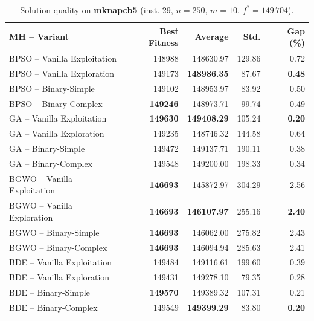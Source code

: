 \documentclass[journal,article,submit,moreauthors]{Definitions/mdpi}
\begin{document}
\begin{table}[htbp]
  \centering
  \small
  \caption{Solution quality on \textbf{mknapcb5} (inst. 29, $n=250$, $m=10$, $f^*=149\,704$).}
  \label{tab:calidad_mknapcb5_29}
  \begin{tabular}{lrrrr}
    \toprule
    \textbf{MH -- Variant} &
    \textbf{Best Fitness} &
    \textbf{Average} &
    \textbf{Std.} &
    \textbf{Gap (\%)} \\
    \midrule
    BPSO -- Vanilla Exploitation &         148988 &        148630.97 & 129.86 &         0.72 \\
    BPSO -- Vanilla Exploration  &         149173 & \textbf{148986.35} &  87.67 & \textbf{0.48} \\
    BPSO -- Binary-Simple        &         149102 &        148953.97 &  83.92 &         0.50 \\
    BPSO -- Binary-Complex       & \textbf{149246} &        148973.71 &  99.74 &         0.49 \\
    \midrule
    GA -- Vanilla Exploitation   & \textbf{149630} & \textbf{149408.29} & 105.24 & \textbf{0.20} \\
    GA -- Vanilla Exploration    &         149235 &        148746.32 & 144.58 &         0.64 \\
    GA -- Binary-Simple          &         149472 &        149137.71 & 190.11 &         0.38 \\
    GA -- Binary-Complex         &         149548 &        149200.00 & 198.33 &         0.34 \\
    \midrule
    BGWO -- Vanilla Exploitation & \textbf{146693} &        145872.97 & 304.29 &         2.56 \\
    BGWO -- Vanilla Exploration  & \textbf{146693} & \textbf{146107.97} & 255.16 & \textbf{2.40} \\
    BGWO -- Binary-Simple        & \textbf{146693} &        146062.00 & 275.82 &         2.43 \\
    BGWO -- Binary-Complex       & \textbf{146693} &        146094.94 & 285.63 &         2.41 \\
    \midrule
    BDE -- Vanilla Exploitation  &         149484 &        149116.61 & 199.60 &         0.39 \\
    BDE -- Vanilla Exploration   &         149431 &        149278.10 &  79.35 &         0.28 \\
    BDE -- Binary-Simple         & \textbf{149570} &        149389.32 & 107.31 &         0.21 \\
    BDE -- Binary-Complex        &         149549 & \textbf{149399.29} &  83.80 & \textbf{0.20} \\
    \bottomrule
  \end{tabular}
\end{table}
\end{document}

